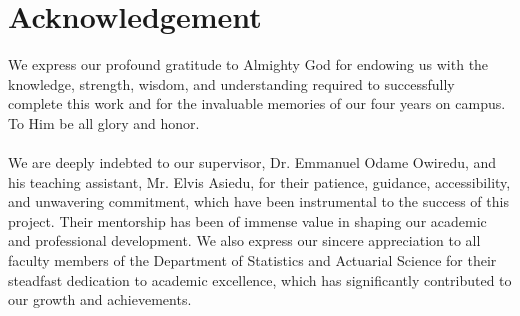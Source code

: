\chapter*{Acknowledgement}
We express our profound gratitude to Almighty God for endowing us with the knowledge, strength, wisdom, and understanding required to successfully complete this work and for the invaluable memories of our four years on campus. To Him be all glory and honor.
\\\\
We are deeply indebted to our supervisor, Dr. Emmanuel Odame Owiredu, and his teaching assistant, Mr. Elvis Asiedu, for their patience, guidance, accessibility, and unwavering commitment, which have been instrumental to the success of this project. Their mentorship has been of immense value in shaping our academic and professional development.
We also express our sincere appreciation to all faculty members of the Department of Statistics and Actuarial Science for their steadfast dedication to academic excellence, which has significantly contributed to our growth and achievements.